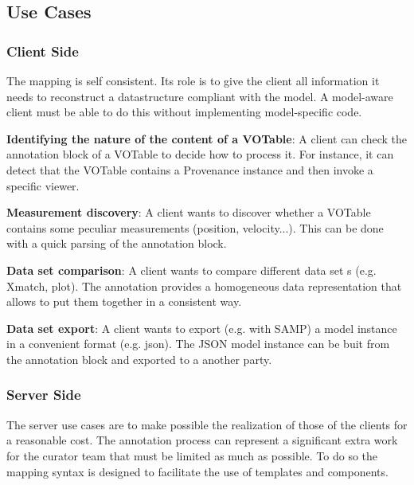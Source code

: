 \documentclass[11pt,a4paper]{ivoa}
\begin{document}
\subsection{Use Cases}

\subsubsection{Client Side}

The mapping is self consistent. Its role is to give the client all information it needs to reconstruct a datastructure compliant with the model. 
A model-aware client must be able to do this without implementing model-specific  code.  

\textbf{Identifying the nature of the content of a VOTable}:  A client can check the annotation block of a VOTable to decide how to process it. For instance, it can detect that the VOTable contains a Provenance instance  and then invoke a specific viewer. 

\textbf{Measurement discovery}: A client wants to discover whether a VOTable contains some peculiar measurements (position, velocity...). This can be done with a quick parsing of the annotation block.

\textbf{Data set comparison}: A client wants to compare different data set s (e.g. Xmatch, plot). The annotation provides a homogeneous data representation that allows to put them together in a consistent way. 

\textbf{Data set export}: A client wants to export (e.g. with SAMP) a model instance in a convenient format (e.g. json). The JSON model instance can be buit from the annotation block and exported to a another party.

\subsubsection{Server Side}
The server use cases are to make possible the realization of those of the clients  for a reasonable cost. The annotation process can represent a significant extra work for the curator team that must be limited as much as possible. To do so the mapping syntax is designed to facilitate the use of templates and components.
\end{document}
